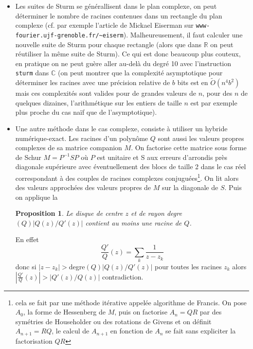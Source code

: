 \documentclass[a4paper,11pt]{book}
\newtheorem{prop}[thm]{Proposition}
\begin{document}
\begin{giacjshere}
\begin{itemize}
\item Les suites de Sturm se g\'en\'erallisent dans le plan complexe, on
peut d\'eterminer le nombre de racines contenues dans un
rectangle du plan complexe (cf. par exemple l'article
de Mickael Eiserman sur \verb|www-fourier.ujf-grenoble.fr/~eiserm|). 
Malheureusement, il faut calculer une nouvelle suite de Sturm
pour chaque rectangle (alors que dans $\mathbb{R}$ on peut r\'eutiliser la
m\^eme suite de Sturm). Ce qui est donc beaucoup plus couteux,
en pratique on ne peut gu\`ere aller au-del\`a du degr\'e 10 avec
l'instruction \verb|sturm| dans $\mathbb{C}$
(on peut montrer que la 
complexit\'e asymptotique pour d\'eterminer les racines
avec une pr\'ecision relative de $b$ bits 
est en $\tilde{O}(n^4b^2)$ mais ces complexit\'es
sont valides pour de grandes valeurs de $n$, pour des $n$
de quelques dizaines, l'arithm\'etique sur les entiers de taille $n$
est par exemple plus proche du cas na\"if que de l'asymptotique).
\item Une autre m\'ethode dans le cas complexe, 
consiste \`a utiliser
un hybride num\'erique-exact. Les racines d'un polyn\^ome $Q$
sont aussi les valeurs
propres complexes de sa matrice companion $M$. On factorise cette matrice
sous forme de Schur $M=P^{-1} S P$ o\`u $P$ est unitaire
et S  aux erreurs d'arrondis pr\`es diagonale sup\'erieure 
avec \'eventuellement des blocs de taille
2 dans le cas r\'eel correspondant \`a des couples de racines
complexes conjugu\'ees\footnote{cela se fait
par une m\'ethode it\'erative appel\'ee algorithme
de Francis. On pose $A_0$, la forme
de Hessenberg de $M$, puis on 
factorise $A_n=QR$ par des sym\'etries de Householder ou
des rotations de Givens et on d\'efinit
$A_{n+1}=RQ$, le calcul de $A_{n+1}$ en fonction de $A_n$
se fait sans expliciter la factorisation $QR$}. On lit alors des valeurs approch\'ees des valeurs
propres de $M$ sur la diagonale de $S$. Puis on applique la
\begin{prop}
Le disque de centre $z$ et de rayon degre$(Q) |Q(z)/Q'(z)|$
contient au moins une racine de $Q$.
\end{prop}
En effet
\[ \frac{Q'}{Q}(z)= \sum_{k} \frac{1}{z-z_k}\]
donc si $|z-z_k| > $degre$(Q) |Q(z)/Q'(z)|$ pour toutes les racines $z_k$ alors
$|\frac{Q'}{Q}(z)| > |Q'(z)/Q(z)|$ contradiction.


\end{itemize}
\end{giacjshere}
\end{document}
